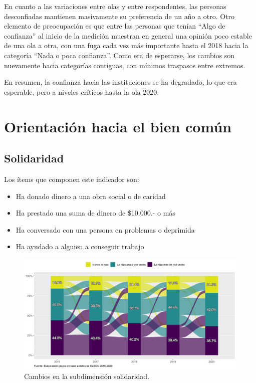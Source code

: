 \documentclass[
  12pt,
]{book}
\begin{document}
En cuanto a las variaciones entre olas y entre respondentes, las personas desconfiadas mantienen masivamente su preferencia de un año a otro. Otro elemento de preocupación es que entre las personas que tenían ``Algo de confianza'' al inicio de la medición muestran en general una opinión poco estable de una ola a otra, con una fuga cada vez más importante hasta el 2018 hacia la categoría ``Nada o poca confianza''. Como era de esperarse, los cambios son nuevamente hacia categorías contiguas, con mínimos traspasos entre extremos.

En resumen, la confianza hacia las instituciones se ha degradado, lo que era esperable, pero a niveles críticos hasta la ola 2020.

\hypertarget{orientaciuxf3n-hacia-el-bien-comuxfan-1}{%
\section{Orientación hacia el bien común}\label{orientaciuxf3n-hacia-el-bien-comuxfan-1}}

\hypertarget{solidaridad}{%
\subsection{Solidaridad}\label{solidaridad}}

Los ítems que componen este indicador son:

\begin{itemize}
\item
  Ha donado dinero a una obra social o de caridad
\item
  Ha prestado una suma de dinero de \$10.000.- o más
\item
  Ha conversado con una persona en problemas o deprimida
\item
  Ha ayudado a alguien a conseguir trabajo
\end{itemize}

\begin{figure}[H]

{\centering \includegraphics[width=1\linewidth,height=1\textheight]{output/graphs/alluvial_solidaridad} 

}

\caption{Cambios en la subdimensión solidaridad.}\label{fig:alluvial-solidaridad}
\end{figure}
\end{document}
